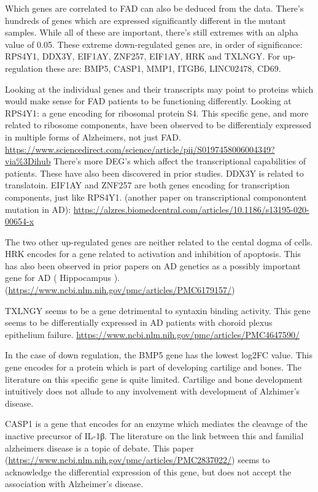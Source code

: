 \documentclass[
]{article}
\begin{document}
Which genes are correlated to FAD can also be deduced from the data.
There's hundreds of genes which are expressed significantly different in
the mutant samples. While all of these are important, there's still
extremes with an alpha value of 0.05. These extreme down-regulated genes
are, in order of significance: RPS4Y1, DDX3Y, EIF1AY, ZNF257, EIF1AY,
HRK and TXLNGY. For up-regulation these are: BMP5, CASP1, MMP1, ITGB6,
LINC02478, CD69.

Looking at the individual genes and their transcripts may point to
proteins which would make sense for FAD patients to be functioning
differently. Looking at RPS4Y1: a gene encoding for ribosomal protein
S4. This specific gene, and more related to ribosome components, have
been observed to be differentialy expressed in multiple forms of
Alzheimers, not just FAD.
\url{https://www.sciencedirect.com/science/article/pii/S0197458006004349?via\%3Dihub}
There's more DEG's which affect the transcriptional capabilities of
patients. These have also been discovered in prior studies. DDX3Y is
related to translatoin. EIF1AY and ZNF257 are both genes encoding for
transcription components, just like RPS4Y1. (another paper on
transcriptional componontent mutation in AD):
\url{https://alzres.biomedcentral.com/articles/10.1186/s13195-020-00654-x}

The two other up-regulated genes are neither related to the cental dogma
of cells. HRK encodes for a gene related to activation and inhibition of
apoptosis. This has also been observed in prior papers on AD genetics as
a possibly important gene for AD ( Hippocampus ).
(\url{https://www.ncbi.nlm.nih.gov/pmc/articles/PMC6179157/})

TXLNGY seems to be a gene detrimental to syntaxin binding activity. This
gene seems to be differentially expressed in AD patients with choroid
plexus epithelium failure.
\url{https://www.ncbi.nlm.nih.gov/pmc/articles/PMC4647590/}

In the case of down regulation, the BMP5 gene has the lowest log2FC
value. This gene encodes for a protein which is part of developing
cartilige and bones. The literature on this specific gene is quite
limited. Cartilige and bone development intuitively does not allude to
any involvement with development of Alzhimer's disease.

CASP1 is a gene that encodes for an enzyme which mediates the cleavage
of the inactive precursor of IL-1β. The literature on the link between
this and familial alzheimers disease is a topic of debate. This paper
(\url{https://www.ncbi.nlm.nih.gov/pmc/articles/PMC2837022/}) seems to
acknowledge the differential expression of this gene, but does not
accept the association with Alzheimer's disease.
\end{document}
